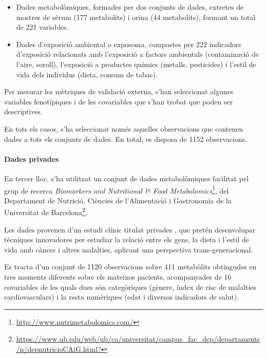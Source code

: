 \documentclass[CAT,BIB]{TFUOC}%
\begin{document}
        \begin{itemize}
            \item Dades metabolòmiques, formades per dos conjunts de dades,
            extretes de mostres de sèrum (177 metabolits) i orina (44 metabolits),
            formant un total de 221 variables.

            \item Dades d'exposició ambiental o exposoma,
            compostes per 222 indicadors d'exposició
            relacionats amb l'exposició a factors ambientals
            (contaminació de l'aire, soroll),
            l'exposició a productes químics
            (metalls, pesticides)
            i l'estil de vida dels individus
            (dieta, consum de tabac).
        \end{itemize}

        Per mesurar les mètriques de validació externa,
        s'han seleccionat algunes variables fenotípiques i de les covariables
        que s'han trobat que poden ser descriptives.

        En tots els casos,
        s'ha seleccionat només aquelles observacions
        que contenen dades a tots els conjunts de dades.
        En total, es disposa de 1152 observacions.

    \paragraph{Dades \acrshort{privades}}
        En tercer lloc,
        s'ha utilitzat un conjunt de dades metabolòmiques
        facilitat pel grup de recerca
        \textit{Biomarkers and Nutritional \& Food Metabolomics}\footnote{\url{http://www.nutrimetabolomics.com/}},
        del Departament de Nutrició, Ciències de l'Alimentació i Gastronomia
        de la Universitat de Barcelona\footnote{\url{https://www.ub.edu/web/ub/ca/universitat/campus_fac_dep/departaments/n/depnutricioCAiG.html?}}.

        Les dades provenen d'un estudi clínic titulat
        \gls{privades} \citep{Petersen2022},
        que pretén desenvolupar tècniques innovadores
        per estudiar la relació entre els gens, la dieta i l'estil de vida
        amb càncer i altres malalties,
        aplicant una perspectiva trans-generacional.

        Es tracta d'un conjunt de 1120 observacions
        sobre 411 metabòlits
        obtingudes en tres moments diferents sobre els mateixos pacients,
        acompanyades de 16 covariables
        de les quals dues són categòriques
        (gènere, índex de risc de malalties cardiovasculars)
        i la resta numèriques
        (edat i diversos indicadors de salut).
\end{document}
